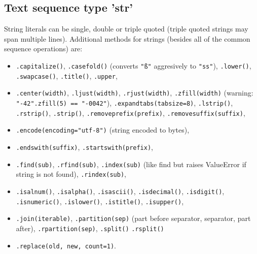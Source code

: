 \subsection{Text sequence type 'str'}
String literals can be single, double or triple quoted (triple quoted strings may span multiple lines).
Additional methods for strings (besides all of the common sequence operations) are:
\begin{itemize}
    \item
\texttt{.capitalize()},
\texttt{.casefold()} (converts \texttt{"ß"} aggresively to \texttt{"ss"}),
\texttt{.lower()},
\texttt{.swapcase()},
\texttt{.title()},
\texttt{.upper},
    \item
    \texttt{.center(width)},
    \texttt{.ljust(width)},
    \texttt{.rjust(width)},
    \texttt{.zfill(width)} (warning: \texttt{"-42".zfill(5) == "-0042"}),
    \texttt{.expandtabs(tabsize=8)},
    \texttt{.lstrip()},
    \texttt{.rstrip()},
    \texttt{.strip()},
    \texttt{.removeprefix(prefix)},
    \texttt{.removesuffix(suffix)},
    \item
    \texttt{.encode(encoding="utf-8")} (string encoded to bytes),
    \item
    \texttt{.endswith(suffix)},
    \texttt{.startswith(prefix)},
        \item
    \texttt{.find(sub)},
    \texttt{.rfind(sub)},
    \texttt{.index(sub)} (like find but raises ValueError if string is not found),
    \texttt{.rindex(sub)},
    \item
    \texttt{.isalnum()},
    \texttt{.isalpha()},
    \texttt{.isascii()},
    \texttt{.isdecimal()},
    \texttt{.isdigit()},
    \texttt{.isnumeric()},
    \texttt{.islower()},
    \texttt{.istitle()},
    \texttt{.isupper()},
    \item
    \texttt{.join(iterable)},
    \texttt{.partition(sep)} (part before separator, separator, part after),
    \texttt{.rpartition(sep)},
    \texttt{.split()}
    \texttt{.rsplit()} 
    \item
    \texttt{.replace(old, new, count=1)}.
\end{itemize}

